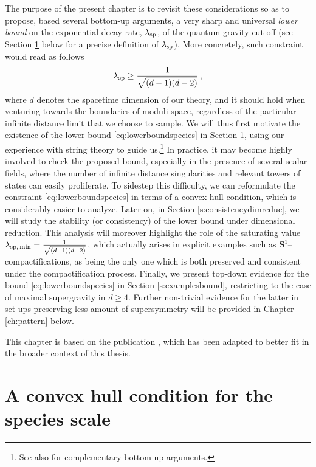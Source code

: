 The purpose of the present chapter is to revisit these considerations so as to propose, based several bottom-up arguments, a very sharp and universal \emph{lower bound} on the exponential decay rate, $\lambda_{\rm sp}$, of the quantum gravity cut-off (see Section \ref{s:convexhull} below for a precise definition of $\lambda_{\rm sp}$). More concretely, such constraint would read as follows
%
\begin{equation}\label{eq:lowerboundspecies}
  \lambda_{\rm sp} \geq \frac{1}{\sqrt{(d-1)(d-2)}}\, ,
\end{equation}
%
where $d$ denotes the spacetime dimension of our theory, and it should hold when venturing towards the boundaries of moduli space, regardless of the particular infinite distance limit that we choose to sample. We will thus first motivate the existence of the lower bound \eqref{eq:lowerboundspecies} in Section \ref{s:convexhull}, using our experience with string theory to guide us.\footnote{See also \cite{Calderon-Infante:2023ler} for complementary bottom-up arguments.} In practice, it may become highly involved to check the proposed bound, especially in the presence of several scalar fields, where the number of infinite distance singularities and relevant towers of states can easily proliferate. To sidestep this difficulty, we can reformulate the constraint \eqref{eq:lowerboundspecies} in terms of a convex hull condition, which is considerably easier to analyze. Later on, in Section \ref{s:consistencydimreduc}, we will study the stability (or consistency) of the lower bound under dimensional reduction. This analysis will moreover highlight the role of the saturating value $\lambda_{\rm sp,\, min} = \frac{1}{\sqrt{(d-1)(d-2)}}$, which actually arises in explicit examples such as $\mathbf{S}^1$--\,compactifications, as being the only one which is both preserved and consistent under the compactification process. Finally, we present top-down evidence for the bound \eqref{eq:lowerboundspecies} in Section \ref{s:examplesbound}, restricting to the case of maximal supergravity in $d\geq4$. Further non-trivial evidence for the latter in set-ups preserving less amount of supersymmetry will be provided in Chapter \ref{ch:pattern} below.

This chapter is based on the publication \cite{Calderon-Infante:2023ler}, which has been adapted to better fit in the broader context of this thesis.

\section{A convex hull condition for the species scale}
\label{s:convexhull}


